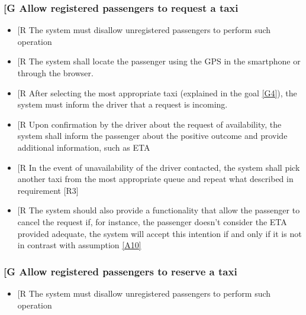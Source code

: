 \documentclass[a4paper,12pt]{article}%
\newcounter{goals_counter}
\newcounter{func_req_counter}
\begin{document}
\subsubsection{\label{goal\arabic{goals_counter}}{[}G\arabic{goals_counter}{]} Allow registered passengers to request a taxi}
\begin{itemize}
\item {[}R\arabic{func_req_counter}{]} The system must disallow unregistered passengers to perform such operation
\item {[}R\arabic{func_req_counter}{]} The system shall locate the passenger using the GPS in the smartphone or through the browser.
\item {[}R\arabic{func_req_counter}{]} After selecting the most appropriate taxi (explained in the goal \hyperref[goal4]{[G4]}), the system must inform the driver that a request is incoming.
\item {[}R\arabic{func_req_counter}{]} Upon confirmation by the driver about the request of availability, the system shall inform the passenger about the positive outcome and provide additional information, such as ETA
\item {[}R\arabic{func_req_counter}{]} In the event of unavailability of the driver contacted, the system shall pick another taxi from the most appropriate queue and repeat what described in requirement [R3]
\item {[}R\arabic{func_req_counter}{]} The system should also provide a functionality that allow the passenger to cancel the request if, for instance, the passenger doesn't consider the ETA provided adequate, the system will accept this intention if and only if it is not in contrast with assumption \hyperref[a10]{[A10]}
\end{itemize}
\setcounter{func_req_counter}{1}
\subsubsection{\label{goal\arabic{goals_counter}}{[}G\arabic{goals_counter}{]} Allow registered passengers to reserve a taxi}
\begin{itemize}
\item {[}R\arabic{func_req_counter}{]} The system must disallow unregistered passengers to perform such operation
\end{itemize}
\end{document}
